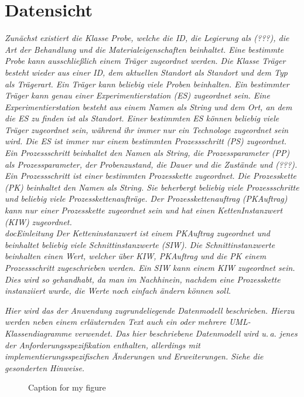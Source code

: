 \documentclass[enabledeprecatedfontcommands,fontsize=12pt,paper=a4,twoside]{scrartcl}
\begin{document}
\section{Datensicht}
\label{sec:datensicht}


{ \em Zunächst existiert die Klasse Probe, welche die ID, die Legierung als (???), die Art der Behandlung und die Materialeigenschaften beinhaltet. Eine bestimmte Probe kann ausschließlich einem Träger zugeordnet werden. 
Die Klasse Träger besteht wieder aus einer ID, dem aktuellen Standort als  Standort und dem Typ als Trägerart. Ein Träger kann beliebig viele Proben beinhalten. Ein bestimmter Träger kann genau einer Experimentierstation (ES) zugeordnet sein. Eine Experimentierstation besteht aus einem Namen als String und dem Ort, an dem die ES zu finden ist als Standort. Einer bestimmten ES können beliebig viele Träger zugeordnet sein, während ihr immer nur ein  Technologe zugeordnet sein wird. Die ES ist immer nur einem bestimmten Prozessschritt (PS) zugeordnet. Ein Prozessschritt beinhaltet den Namen als String, die Prozessparameter (PP) als Prozessparameter, der Probenzustand, die Dauer und die Zustände und (???). Ein Prozessschritt ist einer bestimmten Prozesskette zugeordnet. Die Prozesskette (PK) beinhaltet den Namen als String. Sie beherbergt beliebig viele Prozessschritte und beliebig viele Prozesskettenaufträge. Der  Prozesskettenauftrag (PKAuftrag) kann nur einer Prozesskette zugeordnet sein und hat einen KettenInstanzwert (KIW) zugeordnet. \\
docEinleitung
Der Ketteninstanzwert ist einem PKAuftrag zugeordnet und beinhaltet beliebig viele Schnittinstanzwerte (SIW). Die Schnittinstanzwerte beinhalten einen Wert, welcher über KIW, PKAuftrag und die PK einem Prozessschritt zugeschrieben werden. Ein SIW kann einem KIW zugeordnet sein. 
Dies wird so gehandhabt, da man im Nachhinein, nachdem eine Prozesskette instanziiert wurde, die Werte noch einfach ändern können soll.
}

{\it Hier wird das der Anwendung zugrundeliegende Datenmodell
  beschrieben. Hierzu werden neben einem erläuternden Text auch ein
  oder mehrere {UML}-Klassendiagramme verwendet. Das hier beschriebene
  Datenmodell wird u.\,a. jenes der Anforderungsspezifikation enthalten,
  allerdings mit implementierungsspezifischen Änderungen und
  Erweiterungen. Siehe die gesonderten Hinweise.}
   
 \begin{figure}
  \caption{Caption for my figure}
  \centering
  
  
 \end{figure}
\end{document}
